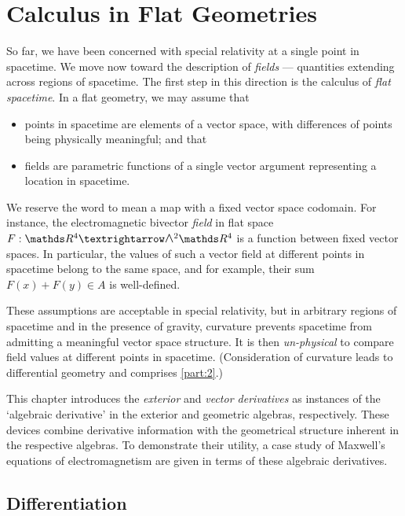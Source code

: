 \chapter{Calculus in Flat Geometries}

So far, we have been concerned with special relativity at a single point in spacetime.
We move now toward the description of \emph{fields} --- quantities extending across regions of spacetime.
The first step in this direction is the calculus of \emph{flat spacetime}.
In a flat geometry, we may assume that
\begin{itemize}
	\item points in spacetime are elements of a vector space, with differences of points being physically meaningful; and that
	\item fields are parametric functions of a single vector argument representing a location in spacetime.
\end{itemize}
We reserve the word  to mean a map with a fixed vector space codomain.
For instance, the electromagnetic bivector \emph{field} in flat space $F : \RR^4 → \EA[2]{\RR^4}$ is a function between fixed vector spaces.
In particular, the values of such a vector field at different points in spacetime belong to the same space, and for example, their sum $F(x) + F(y) ∈ A$ is well-defined.

These assumptions are acceptable in special relativity, but in arbitrary regions of spacetime and in the presence of gravity, curvature prevents spacetime from admitting a meaningful vector space structure.
It is then \emph{un-physical} to compare field values at different points in spacetime.
(Consideration of curvature leads to differential geometry and comprises \cref{part:2}.)

This chapter introduces the \emph{exterior} and \emph{vector derivatives} as instances of the `algebraic derivative' in the exterior and geometric algebras, respectively.
These devices combine derivative information with the geometrical structure inherent in the respective algebras.
To demonstrate their utility, a case study of Maxwell's equations of electromagnetism are given in terms of these algebraic derivatives.


\section{Differentiation}
\label{sec:algder}

